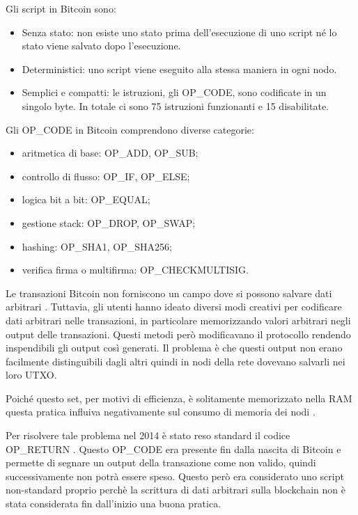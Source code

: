 Gli script \cite{opcode} in Bitcoin sono:
\begin{itemize}
    \item Senza stato: non esiste uno stato prima dell'esecuzione di uno script né lo stato viene salvato dopo l'esecuzione.
    \item Deterministici: uno script viene eseguito alla stessa maniera in ogni nodo.
    \item Semplici e compatti: le istruzioni, gli OP\_CODE, sono codificate in un singolo byte. In totale ci sono 75 istruzioni funzionanti e 15 disabilitate.
\end{itemize}
Gli OP\_CODE in Bitcoin comprendono diverse categorie:
\begin{itemize}
    \item aritmetica di base: OP\_ADD, OP\_SUB;
    \item controllo di flusso: OP\_IF, OP\_ELSE;
    \item logica bit a bit: OP\_EQUAL;
    \item gestione stack: OP\_DROP, OP\_SWAP;
    \item hashing: OP\_SHA1, OP\_SHA256;
    \item verifica firma o multifirma: OP\_CHECKMULTISIG.
\end{itemize}

Le transazioni Bitcoin non forniscono un campo dove si possono salvare dati arbitrari \cite{arbdata}. Tuttavia, gli utenti hanno ideato diversi modi creativi per codificare dati arbitrari nelle transazioni, in particolare memorizzando valori arbitrari negli output delle transazioni. Questi metodi però modificavano il protocollo rendendo inspendibili gli output così generati. Il problema è che questi output non erano facilmente distinguibili dagli altri quindi in nodi della rete dovevano salvarli nei loro UTXO.

Poiché questo set, per motivi di efficienza, è solitamente memorizzato nella RAM \cite{utxo} questa pratica influiva negativamente sul consumo di memoria dei nodi \cite{stresstest}.

Per risolvere tale problema nel 2014 è stato reso standard il codice OP\_RETURN \cite{opreturnstandard} . Questo OP\_CODE era presente fin dalla nascita di Bitcoin e permette di segnare un output della transazione come non valido, quindi successivamente non potrà essere speso. Questo però era considerato uno script non-standard proprio perchè la scrittura di dati arbitrari sulla blockchain non è stata considerata fin dall'inizio una buona pratica.

